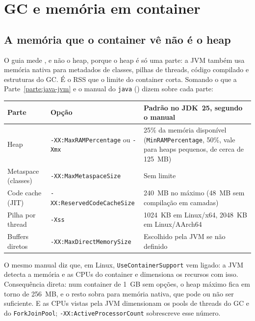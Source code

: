 \section{GC e memória em container}
\label{sec:memoria-container}

\subsection*{A memória que o container vê não é o heap}

O guia  mede
, e não o heap, porque o heap
é só uma parte: a JVM também usa memória nativa para metadados de
classes, pilhas de threads, código compilado e estruturas do GC. É o RSS
que o limite do container corta. Somando o que a Parte~\ref{parte:java-jvm} e o manual do
\texttt{java} () dizem sobre cada parte:

\small
\begin{longtable}{@{}p{3cm} p{4.4cm} p{4.8cm}@{}}
\toprule
Parte & Opção & Padrão no JDK~25, segundo o manual \\
\midrule \endhead
Heap & \texttt{-XX:MaxRAMPercentage} ou \texttt{-Xmx} & 25\% da memória
  disponível (\texttt{MinRAMPercentage}, 50\%, vale para heaps pequenos,
  de cerca de 125~MB) \\
Metaspace (classes) & \texttt{-XX:MaxMetaspaceSize} & Sem limite \\
Code cache (JIT) & \texttt{-XX:ReservedCodeCacheSize} & 240~MB no
  máximo (48~MB sem compilação em camadas) \\
Pilha por thread & \texttt{-Xss} & 1024~KB em Linux/x64, 2048~KB em
  Linux/AArch64 \\
Buffers diretos & \texttt{-XX:MaxDirectMemorySize} & Escolhido pela JVM
  se não definido \\
\bottomrule
\end{longtable}
\normalsize

O mesmo manual diz que, em Linux, \texttt{UseContainerSupport} vem
ligado: a JVM detecta a memória e as CPUs do container e dimensiona os
recursos com isso. Consequência direta: num container de 1~GB sem
opções, o heap máximo fica em torno de 256~MB, e o resto sobra para
memória nativa, que pode ou não ser suficiente. E as CPUs vistas pela JVM
dimensionam os pools de threads do GC e do \texttt{ForkJoinPool};
\texttt{-XX:ActiveProcessorCount} sobrescreve esse número.

